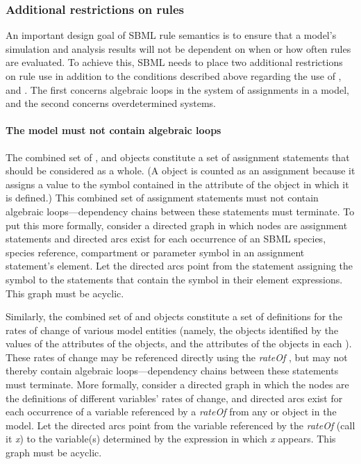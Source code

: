 \subsubsection{Additional restrictions on rules}
\label{sec:ruleconstraints}

An important design goal of SBML rule semantics is to ensure that
a model's simulation and analysis results will not be dependent on
when or how often rules are evaluated.  To achieve this, SBML
needs to place two additional restrictions on rule use in addition
to the conditions described above regarding the use of
\AlgebraicRule, \AssignmentRule and \RateRule.  The first concerns
algebraic loops in the system of assignments in a model, and the
second concerns overdetermined systems.


\paragraph{The model must not contain algebraic loops}

The combined set of \InitialAssignment, \AssignmentRule and
\KineticLaw objects constitute a set of assignment statements that
should be considered as a whole.  (A \KineticLaw object is counted
as an assignment because it assigns a value to the symbol
contained in the  attribute of the \Reaction object in which
it is defined.)  This combined set of assignment statements must
not contain algebraic loops---dependency chains between these
statements must terminate.  To put this more formally, consider a
directed graph in which nodes are assignment statements and
directed arcs exist for each occurrence of an SBML species, species reference,
compartment or parameter symbol in an assignment statement's
 element.  Let the directed arcs point from the
statement assigning the symbol to the statements that contain the
symbol in their  element expressions.  This graph must
be acyclic.

\begin{blockChanged}

Similarly, the combined set of \RateRule and \Reaction objects constitute a set of definitions for the rates of change of various model entities (namely, the objects identified by the values of the  attributes of the \RateRule objects, and the  attributes of the \SpeciesReference objects in each \Reaction).  These rates of change may be referenced directly using the \emph{rateOf} , but may not thereby contain algebraic loops---dependency chains between these statements must terminate.  More formally, consider a directed graph in which the nodes are the definitions of different variables' rates of change, and directed arcs exist for each occurrence of a variable referenced by a \emph{rateOf}  from any \RateRule or \KineticLaw object in the model.  Let the directed arcs point from the variable referenced by the \emph{rateOf}  (call it \emph{x}) to the variable(s) determined by the  expression in which \emph{x} appears.  This graph must be acyclic.

\end{blockChanged}

